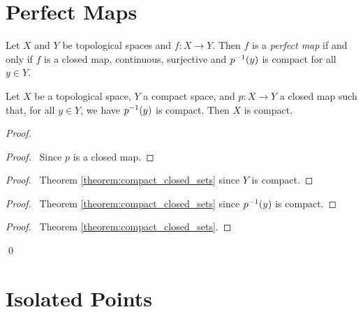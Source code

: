 \section{Perfect Maps}

\begin{definition}
    Let $X$ and $Y$ be topological spaces and $f : X \rightarrow Y$. Then $f$ is a \emph{perfect map} if and only if $f$ is a closed map, continuous,
    surjective and ${p}^{-1}(y)$ is compact for all $y \in Y$.
\end{definition}

\begin{proposition}
    \label{proposition:compact_pre_image}
    Let $X$ be a topological space, $Y$ a compact space, and $p : X \rightarrow Y$ a closed map such that, for all $y \in Y$, we have ${p}^{-1}(y)$ is compact. Then $X$ is compact.
\end{proposition}

\begin{proof}
    \pf
    \begin{proof}
        \pf\ Since $p$ is a closed map.
    \end{proof}
    \begin{proof}
        \pf\ Theorem \ref{theorem:compact_closed_sets} since $Y$ is compact.
    \end{proof}
    \begin{proof}
        \pf\ Theorem \ref{theorem:compact_closed_sets} since ${p}^{-1}(y)$ is compact.
    \end{proof}
    \qedstep
    \begin{proof}
        \pf\ Theorem \ref{theorem:compact_closed_sets}.
    \end{proof}
    \qed
\end{proof}

\section{Isolated Points}

